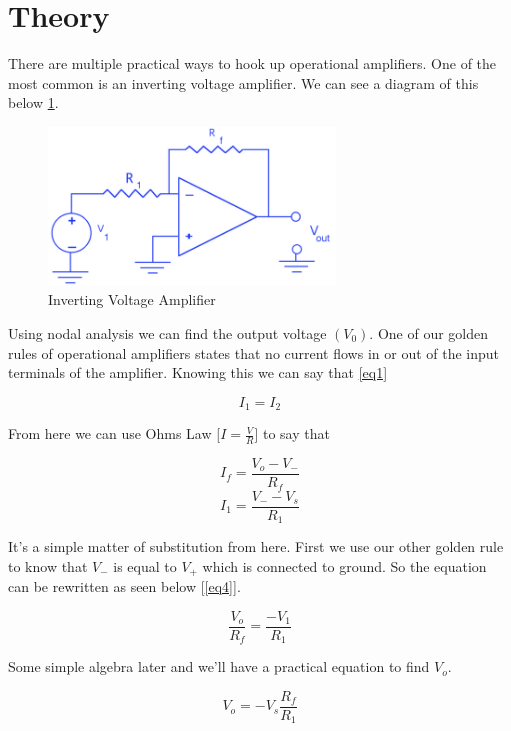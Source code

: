 \documentclass[prb,preprint]{revtex4-1}
\begin{document}
\section{Theory}
There are multiple practical ways to hook up operational amplifiers. One of the most common is an inverting voltage amplifier. We can see a diagram of this below \ref{fig1}.

\begin{figure}[ht]
	\centering
	\includegraphics[width=3in]{circuit1.png}
	\caption{Inverting Voltage Amplifier}
	\label{fig1}
\end{figure}

Using nodal analysis we can find the output voltage $(V_{0})$. One of our golden rules of operational amplifiers states that no current flows in or out of the input terminals of the amplifier. Knowing this we can say that \ref{eq1}

\begin{equation}
I_{1} = I_{2}
\label{eq1}
\end{equation}

From here we can use Ohms Law [$I=\frac{V}{R}$] to say that

\begin{equation}
I_{f} = \frac{V_{o}-V_{-}}{R_{f}}
\label{eq2}
\end{equation}
\begin{equation}
I_{1} = \frac{V_{-}-V_{s}}{R_{1}}
\label{eq3}
\end{equation}

It's a simple matter of substitution from here. First we use our other golden rule to know that $V_{-}$ is equal to $V_{+}$ which is connected to ground. So the equation can be rewritten as seen below [\ref{eq4}].

\begin{equation}
\frac{V_{o}}{R_{f}} = \frac{-V_{1}}{R_{1}}
\label{eq4}
\end{equation}

Some simple algebra later and we'll have a practical equation to find $V_{o}$.

\begin{equation}
V_{o}=-V_{s}\frac{R_{f}}{R_{1}}
\label{eq5}
\end{equation}
\end{document}
